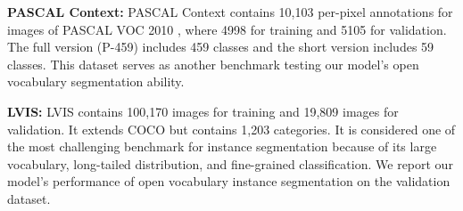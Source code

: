 \documentclass{article}
\theoremstyle{plain}
\theoremstyle{definition}
\theoremstyle{remark}
\begin{document}
\textbf{PASCAL Context:} PASCAL Context  \citep{mottaghi_cvpr14} contains 10,103 per-pixel annotations for images of PASCAL VOC 2010  \citep{pascal-voc-2010}, where 4998 for training and 5105 for validation. The full version (P-459) includes 459 classes and the short version includes 59 classes. This dataset serves as another benchmark testing our model's open vocabulary segmentation ability.

\textbf{LVIS:} LVIS \citep{gupta2019lvis} contains 100,170 images for training and 19,809 images for validation. It extends COCO \citep{lin2014microsoft} but contains 1,203 categories. It is considered one of the most challenging benchmark for instance segmentation because of its large vocabulary, long-tailed distribution, and fine-grained classification. We report our model's performance of open vocabulary instance segmentation on the validation dataset. 

\vspace{-3mm}
\begin{table*}[!htp]
\centering
\caption{\small \textbf{Results on open-vocabulary semantic segmentation.}  A-150 and A-847 represent the ADE20K dataset with 150 classes and 847 classes respectively. P-459 and P-59 represent PASCAL Context dataset with 459 classes and 59 classes respectively. All results use the mIoU metric. All methods presented here don't use extra data other than COCO for training. }
\label{tab:semantic_results}
\vspace{-1mm}
\end{table*}
\end{document}
